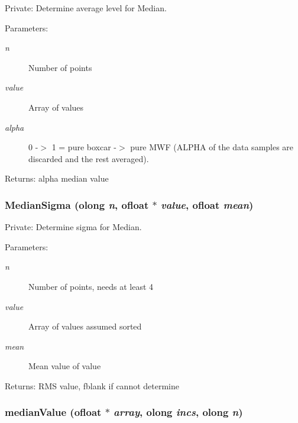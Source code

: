 Private: Determine average level for Median. 

\begin{Desc}
\item[Parameters:]
\begin{description}
\item[{\em n}]Number of points \item[{\em value}]Array of values \item[{\em alpha}]0 -$>$ 1 = pure boxcar -$>$ pure MWF (ALPHA of the data samples are discarded and the rest averaged). \end{description}
\end{Desc}
\begin{Desc}
\item[Returns:]alpha median value \end{Desc}
\subsubsection{ Median\-Sigma ({\bf olong} {\em n}, {\bf ofloat} $\ast$ {\em value}, {\bf ofloat} {\em mean})}\label{ObitUtil_8c_a6}


Private: Determine sigma for Median. 

\begin{Desc}
\item[Parameters:]
\begin{description}
\item[{\em n}]Number of points, needs at least 4 \item[{\em value}]Array of values assumed sorted \item[{\em mean}]Mean value of value \end{description}
\end{Desc}
\begin{Desc}
\item[Returns:]RMS value, fblank if cannot determine \end{Desc}
\subsubsection{ median\-Value ({\bf ofloat} $\ast$ {\em array}, {\bf olong} {\em incs}, {\bf olong} {\em n})}\label{ObitUtil_8c_a2}


